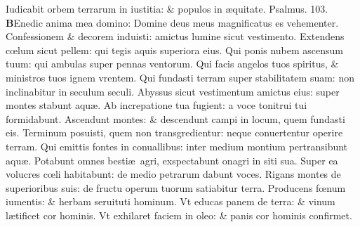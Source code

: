 \documentclass[a5paper,10pt]{book}
\def\ae{æ}
\def\oe{œ}
\begin{document}
\begin{multicols*}{2}
\newline \color{red} I\color{black}udicabit orbem terrarum in iustitia: \& populos in \ae quitate. \quad \color{red} Psalmus. \hypertarget{ps103}{103.} \color{black}
\vspace{-.5em}
\lettrine[lines=2]{\bfseries \color{red} B}{}Enedic anima mea domino: Domine deus meus magnificatus es vehementer.
\newline \color{red} C\color{black}onfessionem \& decorem induisti: amictus lumine sicut vestimento.
\newline \color{red} E\color{black}xtendens c\oe lum sicut pellem: qui tegis aquis superiora eius.
\newline \color{red} Q\color{black}ui ponis nubem ascensum tuum: qui ambulas super pennas ventorum.
\newline \color{red} Q\color{black}ui facis angelos tuos spiritus, \& ministros tuos ignem vrentem.
\newline \color{red} Q\color{black}ui fundasti terram super stabilitatem suam: non inclinabitur in seculum seculi.
\newline \color{red} A\color{black}byssus sicut vestimentum amictus eius: super montes stabunt aqu\ae .
\newline \color{red} A\color{black}b increpatione tua fugient: a voce tonitrui tui formidabunt.
\newline \color{red} A\color{black}scendunt montes: \& descendunt campi in locum, quem fundasti eis.
\newline \color{red} T\color{black}erminum posuisti, quem non transgredientur: neque conuertentur operire terram.
\newline \color{red} Q\color{black}ui emittis fontes in conuallibus: inter medium montium pertransibunt aqu\ae .
\newline \color{red} P\color{black}otabunt omnes besti\ae \ agri, exspectabunt onagri in siti sua.
\newline \color{red} S\color{black}uper ea volucres c\oe li habitabunt: de medio petrarum dabunt voces.
\newline \color{red} R\color{black}igans montes de superioribus suis: de fructu operum tuorum satiabitur terra.
\newline \color{red} P\color{black}roducens f\oe num iumentis: \& herbam seruituti hominum.
\newline \color{red} V\color{black}t educas panem de terra: \& vinum l\ae tificet cor hominis.
\newline \color{red} V\color{black}t exhilaret faciem in oleo: \& panis cor hominis confirmet.

\end{multicols*}
\end{document}
